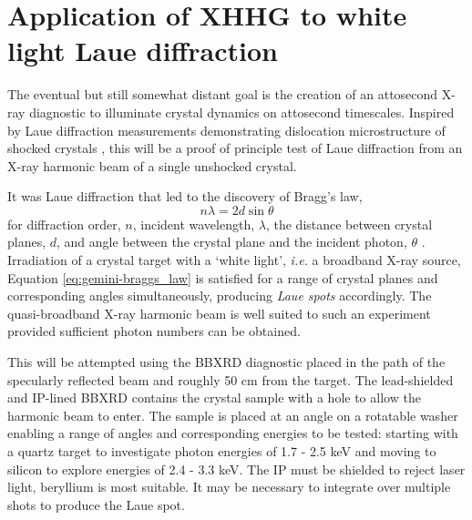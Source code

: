 
\section{Application of XHHG to white light Laue diffraction}\label{sec:ch4-laue}
The eventual but still somewhat distant goal is the creation of an attosecond X-ray diagnostic to illuminate crystal dynamics on attosecond timescales. Inspired by Laue diffraction measurements demonstrating dislocation microstructure of shocked crystals \cite{suggitNanosecondWhitelightLaue2012}, this will be a proof of principle test of Laue diffraction from an X-ray harmonic beam of a single unshocked crystal.

It was Laue diffraction that led to the discovery of Bragg's law,
\begin{equation}\label{eq:gemini-braggs_law}
	n\lambda = 2d\sin\theta
\end{equation}
for diffraction order, $n$, incident wavelength, $\lambda$, the distance between crystal planes, $d$, and angle between the crystal plane and the incident photon, $\theta$ \cite{braggDiffractionWaves1915}. Irradiation of a crystal target with a `white light', \textit{i.e.} a broadband X-ray source, Equation \ref{eq:gemini-braggs_law} is satisfied for a range of crystal planes and corresponding angles simultaneously, producing \textit{Laue spots} accordingly. The quasi-broadband X-ray harmonic beam is well suited to such an experiment provided sufficient photon numbers can be obtained.

This will be attempted using the \ac{BBXRD} diagnostic placed in the path of the specularly reflected beam and roughly 50 cm from the target. The lead-shielded and IP-lined BBXRD contains the crystal sample with a hole to allow the harmonic beam to enter. The sample is placed at an angle on a rotatable washer enabling a range of angles and corresponding energies to be tested: starting with a quartz target to investigate photon energies of 1.7 - 2.5 keV and moving to silicon to explore energies of 2.4 - 3.3 keV. The IP must be shielded to reject laser light, beryllium is most suitable. It may be necessary to integrate over multiple shots to produce the Laue spot.

